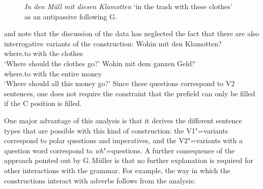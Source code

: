 \begin{exe}
\begin{xlist}[iv.]
\begin{exe}
\begin{xlist}[iv.]
\begin{figure}
\caption{\emph{In den Müll mit diesen Klamotten} `in the trash with these clothes' as an antipassive following G.\,\citet{GMueller2009a}}\label{abb-in-den-Muell-Gereon}
\end{figure}%
\citet{Budde2010a} and \citet{Mache2010a} note that the discussion of the data has neglected the fact that there are also interrogative variants
of the construction:
\eal
\ex 
\gll Wohin mit den Klamotten?\\
	 where.to with the clothes\\
\glt `Where should the clothes go?'
\ex 
\gll Wohin mit dem ganzen Geld?\\
	 where.to with the entire money\\
\glt `Where should all this money go?'
\zl
Since these questions correspond to V2 sentences, one does not require the constraint that the prefield can only be filled if the C position
is filled. 

One major advantage of this analysis is that it derives the different sentence types that are possible with this kind of construction:
the V1"=variants correspond to polar questions and imperatives, and the V2"=variants with a question word correspond to \emph{wh}"=questions.
A further consequence of the approach pointed out by G.\,Müller is that no further explanation is required for
other interactions with the grammar. For example, the way in which the constructions interact with adverbs follows from the analysis:
{
\eal
{}
\zl
\eal
{}
\zl}


\end{xlist}
\end{exe}
\end{xlist}
\end{exe}
